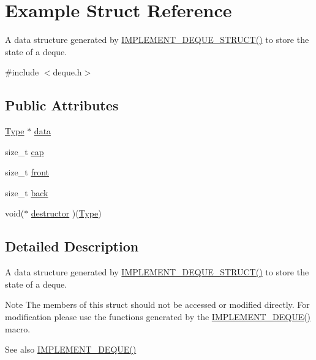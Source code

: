\hypertarget{structExample}{}\section{Example Struct Reference}
\label{structExample}


A data structure generated by \hyperlink{deque_8h_ad1734634a88d702478c08e26e39dc7b8}{I\+M\+P\+L\+E\+M\+E\+N\+T\+\_\+\+D\+E\+Q\+U\+E\+\_\+\+S\+T\+R\+U\+C\+T()} to store the state of a deque.  




{\ttfamily \#include $<$deque.\+h$>$}

\subsection*{Public Attributes}
\begin{DoxyCompactItemize}
\item 
\hyperlink{deque_8h_ac9c83c2070eb6b5891cf742b90f54c68}{Type} $\ast$ \hyperlink{structExample_aff9c97770bf4afc778ac2fc0c693d3b0}{data}
\item 
size\+\_\+t \hyperlink{structExample_a42fd483a97081133af34019cfb99c875}{cap}
\item 
size\+\_\+t \hyperlink{structExample_ad28f26e5c53b98255d98b65e82fae766}{front}
\item 
size\+\_\+t \hyperlink{structExample_ab52696b8c662a542dccff1fabda7de00}{back}
\item 
void($\ast$ \hyperlink{structExample_ae42fbec90128c56bc0c81d06cc17acd3}{destructor} )(\hyperlink{deque_8h_ac9c83c2070eb6b5891cf742b90f54c68}{Type})
\end{DoxyCompactItemize}


\subsection{Detailed Description}
A data structure generated by \hyperlink{deque_8h_ad1734634a88d702478c08e26e39dc7b8}{I\+M\+P\+L\+E\+M\+E\+N\+T\+\_\+\+D\+E\+Q\+U\+E\+\_\+\+S\+T\+R\+U\+C\+T()} to store the state of a deque. 

\begin{DoxyNote}{Note}
The members of this struct should not be accessed or modified directly. For modification please use the functions generated by the \hyperlink{deque_8h_a283e81072037376be2a17b25b1eb1601}{I\+M\+P\+L\+E\+M\+E\+N\+T\+\_\+\+D\+E\+Q\+U\+E()} macro.
\end{DoxyNote}
\begin{DoxySeeAlso}{See also}
\hyperlink{deque_8h_a283e81072037376be2a17b25b1eb1601}{I\+M\+P\+L\+E\+M\+E\+N\+T\+\_\+\+D\+E\+Q\+U\+E()} 
\end{DoxySeeAlso}


